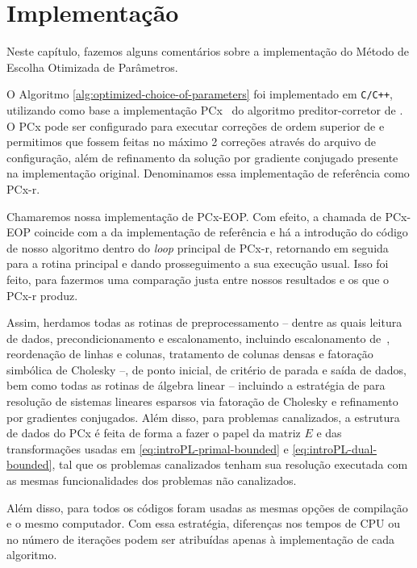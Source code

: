 

\chapter{Implementação}
\label{chap:implementa}
Neste capítulo, fazemos alguns comentários sobre a implementação do Método de Escolha Otimizada de Parâmetros. 


O Algoritmo \ref{alg:optimized-choice-of-parameters} foi implementado em  \texttt{C/C++}, utilizando como base a implementação PCx~\cite{Czyzyk:1999hk} do algoritmo preditor-corretor de \textcite{Mehrotra:1992wr}. O PCx pode ser configurado para executar correções de ordem superior de \textcite{Gondzio:1996uw} e permitimos que fossem feitas no máximo 2 correções através do arquivo de configuração, além de  refinamento da solução por gradiente conjugado presente na implementação original. Denominamos essa implementação de referência como PCx-r.

  Chamaremos nossa implementação de PCx-EOP. Com efeito, a chamada de PCx-EOP coincide com a da implementação de referência e há a introdução do código de nosso algoritmo dentro do \emph{loop} principal de PCx-r,  retornando em seguida para a rotina principal e dando prosseguimento a sua execução usual. Isso foi feito, para fazermos uma comparação justa entre nossos resultados e os que o PCx-r produz. 

  Assim, herdamos todas as rotinas de preprocessamento -- dentre as quais leitura de dados, precondicionamento e escalonamento, incluindo escalonamento de~\textcite{Curtis:1972cp}, reordenação de linhas e colunas, tratamento de colunas densas e fatoração simbólica de Cholesky --, de ponto inicial, de critério de parada e saída de dados,   bem como todas as rotinas de álgebra linear -- incluindo a estratégia  de \textcite{Ng:1993uz} para resolução de sistemas lineares esparsos via fatoração de Cholesky  e refinamento por gradientes conjugados. Além disso, para problemas canalizados, a estrutura de dados do PCx é feita de forma a fazer o papel da matriz $E$ e das transformações usadas em \eqref{eq:introPL-primal-bounded} e \eqref{eq:introPL-dual-bounded}, tal que os problemas canalizados tenham sua resolução executada com  as mesmas funcionalidades dos problemas não canalizados. 



Além disso, para todos os códigos foram usadas as mesmas opções de compilação e o mesmo computador. Com essa estratégia, diferenças nos tempos de CPU ou no número de iterações podem ser atribuídas apenas à implementação de cada algoritmo. 

